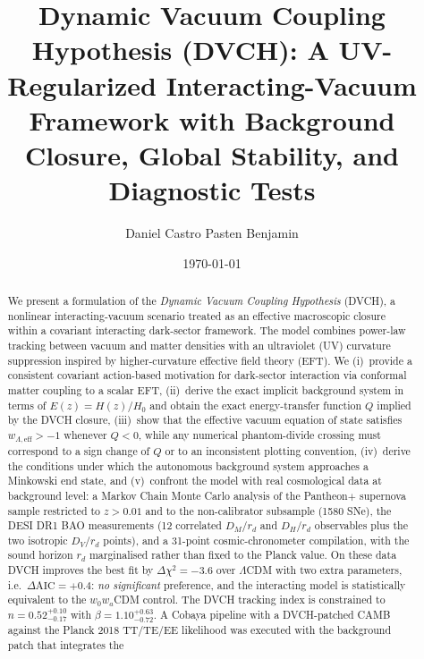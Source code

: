 \documentclass[pdflatex,sn-mathphys-num]{sn-jnl}%
\newif\ifsnclass
\begin{document}
\title{Dynamic Vacuum Coupling Hypothesis (DVCH): A UV-Regularized Interacting-Vacuum Framework with Background Closure, Global Stability, and Diagnostic Tests}

\ifsnclass
\author*[1]{Daniel Castro Pasten Benjamin}
\email{daniel.castropasten9@gmail.com}
\affil[1]{Independent Researcher}
\jyear{2026}
\date{}
\else
\author{Daniel Castro Pasten Benjamin}
\date{\today}
\fi

\begin{abstract}
We present a formulation of the \emph{Dynamic Vacuum Coupling
Hypothesis} (DVCH), a nonlinear interacting-vacuum scenario treated as an
effective macroscopic closure within a covariant interacting dark-sector
framework. The model combines power-law tracking between vacuum and matter
densities with an ultraviolet (UV) curvature suppression inspired by
higher-curvature effective field theory (EFT). We
(i)~provide a consistent covariant action-based motivation for dark-sector
interaction via conformal matter coupling to a scalar EFT,
(ii)~derive the exact implicit background system in terms of
$E(z)=H(z)/H_0$ and obtain the exact energy-transfer function $Q$ implied by
the DVCH closure,
(iii)~show that the effective vacuum equation of state satisfies
$w_{\Lambda,\mathrm{eff}}>-1$ whenever $Q<0$, while any numerical
phantom-divide crossing must correspond to a sign change of $Q$ or to an
inconsistent plotting convention,
(iv)~derive the conditions under which the autonomous background system
approaches a Minkowski end state, and
  (v)~confront the model with real cosmological data at background level:
  a Markov Chain Monte Carlo analysis of the Pantheon$+$ supernova sample
  restricted to $z>0.01$ and to the non-calibrator subsample (1580 SNe),
  the DESI DR1 BAO measurements (12 correlated $D_M/r_d$ and $D_H/r_d$
  observables plus the two isotropic $D_V/r_d$ points), and a 31-point
  cosmic-chronometer compilation, with the sound horizon $r_d$ marginalised
  rather than fixed to the Planck value. On these data DVCH improves the
  best fit by $\Delta\chi^2=-3.6$ over $\Lambda$CDM with two extra
  parameters, i.e.\ $\Delta\mathrm{AIC}=+0.4$: \emph{no significant}
  preference, and the interacting model is statistically equivalent to the
  $w_0w_a$CDM control. The DVCH tracking index is constrained to
  $n=0.52^{+0.10}_{-0.17}$ with $\beta=1.10^{+0.63}_{-0.72}$. A Cobaya
  pipeline with a DVCH-patched CAMB against the Planck 2018 TT/TE/EE
  likelihood was executed with the background patch that integrates the

\end{abstract}
\end{document}
